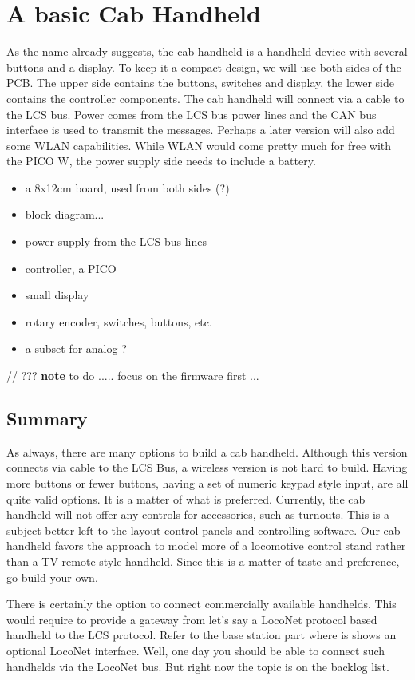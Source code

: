 \chapter{A basic Cab Handheld}

As the name already suggests, the cab handheld is a handheld device with several buttons and a display. To keep it a compact design, we will use both sides of the PCB. The upper side contains the buttons, switches and display, the lower side contains the controller components. The cab handheld will connect via a cable to the LCS bus. Power comes from the LCS bus power lines and the CAN bus interface is used to transmit the messages. Perhaps a later version will also add some WLAN capabilities. While WLAN would come pretty much for free with the PICO W, the power supply side needs to include a battery.
\begin{itemize}
\item a 8x12cm board, used from both sides (?)
\item block diagram...
\item power supply from the LCS bus lines
\item controller, a PICO
\item small display
\item rotary encoder, switches, buttons, etc.
\item a subset for analog ?
\end{itemize}

// ??? \textbf{note} to do ..... focus on the firmware first ...

\section{Summary}

As always, there are many options to build a cab handheld. Although this version connects via cable to the LCS Bus, a wireless version is not hard to build. Having more buttons or fewer buttons, having a set of numeric keypad style input, are all quite valid options. It is a matter of what is preferred. Currently, the cab handheld will not offer any controls for accessories, such as turnouts. This is a subject better left to the layout control panels and controlling software. Our cab handheld favors the approach to model more of a locomotive control stand rather than a TV remote style handheld. Since this is a matter of taste and preference, go build your own.

There is certainly the option to connect commercially available handhelds. This would require to provide a gateway from let's say a LocoNet protocol based handheld to the LCS protocol. Refer to the base station part where is shows an optional LocoNet interface. Well, one day you should be able to connect such handhelds via the LocoNet bus. But right now the topic is on the backlog list.